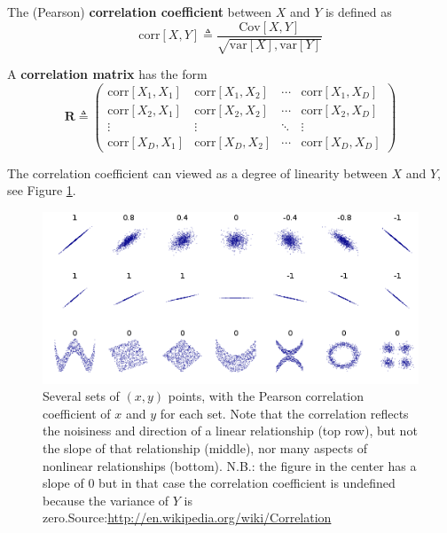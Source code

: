\documentclass[graybox, envcountchap, twocolumn]{styles/svmult}
\begin{document}
\begin{definition}
The (Pearson) \textbf{correlation coefficient} between $X$ and $Y$ is defined as
\begin{equation}
\text{corr}[X,Y] \triangleq \dfrac{\text{Cov}[X,Y]}{\sqrt{\text{var}[X],\text{var}[Y]}}
\end{equation}
\end{definition}

A \textbf{correlation matrix} has the form
\begin{equation}
\mathbf{R} \triangleq \left( \begin{array}{cccc}
           \text{corr}[X_1,X_1] & \text{corr}[X_1,X_2] & \cdots & \text{corr}[X_1,X_D] \\
           \text{corr}[X_2,X_1] & \text{corr}[X_2,X_2] & \cdots & \text{corr}[X_2,X_D] \\
		   \vdots & \vdots & \ddots & \vdots \\
           \text{corr}[X_D,X_1] & \text{corr}[X_D,X_2] & \cdots & \text{corr}[X_D,X_D] \end{array} \right)
\end{equation}

The correlation coefficient can viewed as a degree of linearity between $X$ and $Y$, see Figure \ref{fig:Correlation-examples}.
\begin{figure}[hbtp]
\centering
    \includegraphics[scale=.80]{Correlation-examples.png}
\caption{Several sets of $(x, y)$ points, with the Pearson correlation coefficient of $x$ and $y$ for each set. Note that the correlation reflects the noisiness and direction of a linear relationship (top row), but not the slope of that relationship (middle), nor many aspects of nonlinear relationships (bottom). N.B.: the figure in the center has a slope of 0 but in that case the correlation coefficient is undefined because the variance of $Y$ is zero.Source:\url{http://en.wikipedia.org/wiki/Correlation}}
\label{fig:Correlation-examples} 
\end{figure}
\end{document}
